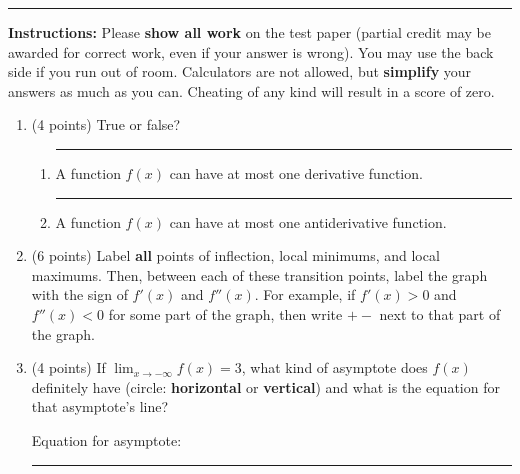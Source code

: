 \documentclass[11pt]{article}
\begin{document}
\Large



\medskip\hrule
\vspace{20pt}

\noindent \textbf{Instructions:} Please \textbf{show all work} on the test paper (partial credit may be awarded for correct work, even if your answer is wrong). You may use the back side if you run out of room. Calculators are not allowed, but \textbf{simplify} your answers as much as you can. Cheating of any kind will result in a score of zero.

\vspace{10pt}

\begin{enumerate}[itemsep=30pt]

\item (4 points) True or false?
\begin{enumerate}[itemsep=10pt]
    \item \rule{1cm}{0.4pt} A function $f(x)$ can have at most one derivative function.
    \item \rule{1cm}{0.4pt} A function $f(x)$ can have at most one antiderivative function.
\end{enumerate}

\item (6 points) Label \textbf{all} points of inflection, local minimums, and local maximums. Then, between each of these transition points, label the graph with the sign of $f'(x)$ and $f''(x)$. For example, if $f'(x)>0$ and $f''(x)<0$ for some part of the graph, then write $+-$ next to that part of the graph.
\vspace{10pt}
\begin{center}
\end{center}


\item (4 points) If $\lim_{x \to -\infty} f(x) = 3$, what kind of asymptote does $f(x)$ definitely have (circle: \textbf{horizontal} or \textbf{vertical}) and what is the equation for that asymptote's line?
\begin{flushright}
Equation for asymptote: \rule{4cm}{0.4pt}
\end{flushright}


\end{enumerate}
\end{document}
